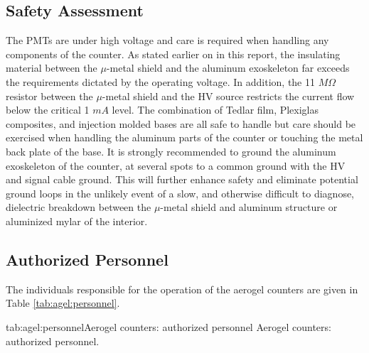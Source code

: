 \begin{safetyen}{10}{10}
\section{Safety Assessment}

The PMTs are under high voltage and care is required when handling any 
components of the counter. As stated earlier on in this report, the insulating 
material between the $\mu$-metal shield and the aluminum exoskeleton far 
exceeds the requirements dictated by the operating voltage. 
In addition, the 11 $M\Omega$ resistor between 
the $\mu$-metal shield and the HV source restricts the current flow below the  
critical 1 $mA$ level. The combination of Tedlar film, Plexiglas composites, 
and injection molded bases are all safe to handle but care should be 
exercised when handling the aluminum parts of the counter or touching the metal 
back plate of the base. It is strongly recommended to ground the aluminum 
exoskeleton of the counter, at several spots to a common ground with the HV 
and signal cable ground. This will further enhance safety and eliminate 
potential ground loops in the unlikely event of a slow, and otherwise difficult 
to diagnose, dielectric breakdown between the $\mu$-metal shield and aluminum 
structure or aluminized mylar of the interior.  

\end{safetyen}

\begin{safetyen}{10}{15}
\section{Authorized Personnel}
\end{safetyen}

The individuals responsible for the operation 
of the aerogel \Cherenkov{} counters are given in Table \ref{tab:agel:personnel}.

\begin{namestab}{tab:agel:personnel}{Aerogel counters: authorized personnel}{%
      Aerogel counters: authorized personnel.}
\end{namestab}


